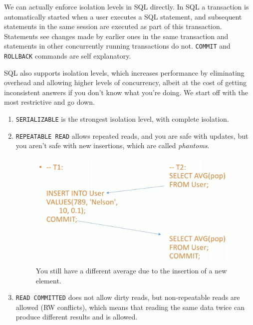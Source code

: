     We can actually enforce isolation levels in SQL directly. In SQL a transaction is automatically started when a user executes a SQL statement, and subsequent statements in the same session are executed as part of this transaction. Statements see changes made by earlier ones in the same transaction and statements in other concurrently running transactions do not. \texttt{COMMIT} and \texttt{ROLLBACK} commands are self explanatory.  
     
    SQL also supports isolation levels, which increases performance by eliminating overhead and allowing higher levels of concurrency, albeit at the cost of getting inconsistent answers if you don't know what you're doing. We start off with the most restrictive and go down. 
    \begin{enumerate}
      \item \texttt{SERIALIZABLE} is the strongest isolation level, with complete isolation. 

      \item \texttt{REPEATABLE READ} allows repeated reads, and you are safe with updates, but you aren't safe with new insertions, which are called \textit{phantoms}. 

      \begin{figure}[H]
        \centering 
        \includegraphics[scale=0.4]{img/rep_read.png}
        \caption{You still have a different average due to the insertion of a new element. } 
        \label{fig:rep_read}
      \end{figure}

      \item \texttt{READ COMMITTED} does not allow dirty reads, but non-repeatable reads are allowed (RW conflicts), which means that reading the same data twice can produce different results and is allowed. 


\end{enumerate}

